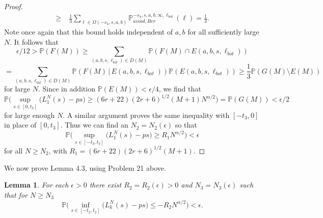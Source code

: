 \documentclass[12pt]{article}
\newtheorem{lemma}{Lemma}
\begin{document}
\begin{proof}
\begin{align*}
		\geq \; & \frac{1}{3}\sum_{\ell\in\Omega(-s_4,s,a,b)} \mathbb{P}^{-s_4,s,a,b,\infty,\ell_{bot}}_{avoid, Ber}(\ell) = \frac{1}{3}.
		\end{align*}
		Note once again that this bound holds independent of $a,b$ for all sufficiently large $N$. It follows that
		\[
		\epsilon/12 > \mathbb{P}(F(M)) \geq \sum_{(a,b,s,\ell_{bot})\in D(M)} \mathbb{P}(F(M)\cap E(a,b,s,\ell_{bot}))
		\]
		\[
		= \sum_{(a,b,s,\ell_{bot})\in D(M)} \mathbb{P}(F(M)\,|\, E(a,b,s,\ell_{bot}))\mathbb{P}(E(a,b,s,\ell_{bot})) \geq \frac{1}{3}\mathbb{P}(G(M)\setminus E(M))
		\]
		for large $N$. Since in addition $\mathbb{P}(E(M)) < \epsilon/4$, we find that
		\[
		\mathbb{P}\Big( \sup_{s \in [0,t_3] }\big( L^N_1(s) - p s \big) \geq  (6r+22)(2r+6)^{1/2}(M+1)N^{\alpha/2} \Big) = \mathbb{P}(G(M)) < \epsilon/2
		\]
		for large enough $N$. A similar argument proves the same inequality with $[-t_3,0]$ in place of $[0,t_3]$. Thus we can find an $N_2 = N_2(\epsilon)$ so that
		\[
		\mathbb{P}\Big( \sup_{s \in [-t_3,t_3] }\big( L^N_1(s) - p s \big) \geq  R_1N^{\alpha/2} \Big) < \epsilon
		\]
		for all $N\geq N_2$, with $R_1 = (6r+22)(2r+6)^{1/2}(M+1)$.
		
	\end{proof}

	We now prove Lemma 4.3, using Problem 21 above.

	\begin{lemma}\label{PropSup2} For each $\epsilon > 0$ there exist $R_2=R_2( \epsilon) > 0$ and $N_3=N_3(\epsilon)$ such that for $N \geq N_3$
	$$\mathbb{P}\Big( \inf_{s \in [ -t_2, t_2 ]}\big(L^N_k(s) - p s \big) \leq - R_2N^{\alpha/2} \Big) < \epsilon.$$
	\end{lemma}
\end{document}
